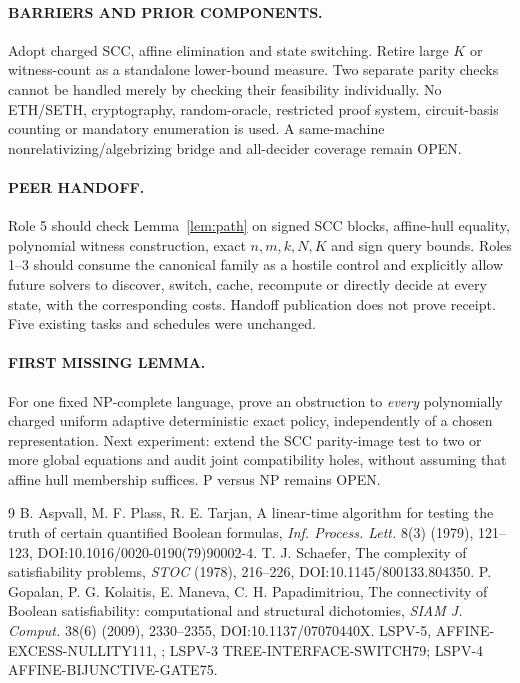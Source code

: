 \documentclass[11pt]{article}
\begin{document}
\paragraph{BARRIERS AND PRIOR COMPONENTS.}
Adopt charged SCC, affine elimination and state switching. Retire large $K$ or witness-count as a standalone lower-bound measure. Two separate parity checks cannot be handled merely by checking their feasibility individually. No ETH/SETH, cryptography, random-oracle, restricted proof system, circuit-basis counting or mandatory enumeration is used. A same-machine nonrelativizing/algebrizing bridge and all-decider coverage remain OPEN.
\paragraph{PEER HANDOFF.}
Role 5 should check Lemma~\ref{lem:path} on signed SCC blocks, affine-hull equality, polynomial witness construction, exact $n,m,k,N,K$ and sign query bounds. Roles 1--3 should consume the canonical family as a hostile control and explicitly allow future solvers to discover, switch, cache, recompute or directly decide at every state, with the corresponding costs. Handoff publication does not prove receipt. Five existing tasks and schedules were unchanged.
\paragraph{FIRST MISSING LEMMA.}
For one fixed NP-complete language, prove an obstruction to \emph{every} polynomially charged uniform adaptive deterministic exact policy, independently of a chosen representation. Next experiment: extend the SCC parity-image test to two or more global equations and audit joint compatibility holes, without assuming that affine hull membership suffices. P versus NP remains OPEN.

\begin{thebibliography}{9}
 B. Aspvall, M. F. Plass, R. E. Tarjan, A linear-time algorithm for testing the truth of certain quantified Boolean formulas, \emph{Inf. Process. Lett.} 8(3) (1979), 121--123, DOI:10.1016/0020-0190(79)90002-4.
 T. J. Schaefer, The complexity of satisfiability problems, \emph{STOC} (1978), 216--226, DOI:10.1145/800133.804350.
 P. Gopalan, P. G. Kolaitis, E. Maneva, C. H. Papadimitriou, The connectivity of Boolean satisfiability: computational and structural dichotomies, \emph{SIAM J. Comput.} 38(6) (2009), 2330--2355, DOI:10.1137/07070440X.
 LSPV-5, AFFINE-EXCESS-NULLITY111, ; LSPV-3 TREE-INTERFACE-SWITCH79; LSPV-4 AFFINE-BIJUNCTIVE-GATE75.
\end{thebibliography}
\end{document}
